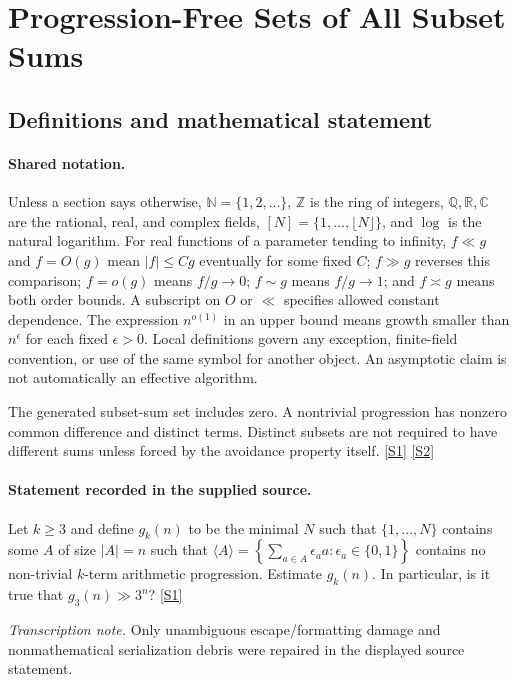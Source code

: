 \documentclass[11pt,a4paper]{article}
\newcommand{\N}{\mathbb{N}}
\newcommand{\Z}{\mathbb{Z}}
\newcommand{\Q}{\mathbb{Q}}
\newcommand{\R}{\mathbb{R}}
\newcommand{\C}{\mathbb{C}}
\newcommand{\sref}[2]{\hyperlink{source:#1:#2}{[S#2]}}
\begin{document}
\section{Progression-Free Sets of All Subset Sums}\label{statement}


\subsection{Definitions and mathematical statement}

\paragraph{Shared notation.}Unless a section says otherwise, $\N=\{1,2,\ldots\}$,
$\Z$ is the ring of integers, $\Q,\R,\C$ are the rational, real, and complex
fields, $[N]=\{1,\ldots,\lfloor N\rfloor\}$, and $\log$ is the natural
logarithm. For real functions of a parameter tending to infinity,
$f\ll g$ and $f=O(g)$ mean $|f|\leq Cg$ eventually for some fixed $C$;
$f\gg g$ reverses this comparison; $f=o(g)$ means $f/g\to0$;
$f\sim g$ means $f/g\to1$; and $f\asymp g$ means both order bounds.
A subscript on $O$ or $\ll$ specifies allowed constant dependence.
The expression $n^{o(1)}$ in an upper bound means growth smaller than
$n^\epsilon$ for each fixed $\epsilon>0$. Local definitions govern any
exception, finite-field convention, or use of the same symbol for another
object. An asymptotic claim is not automatically an effective algorithm.



The generated subset-sum set includes zero. A nontrivial progression has nonzero common difference and distinct terms. Distinct subsets are not required to have different sums unless forced by the avoidance property itself. \sref{statement}{1} \sref{statement}{2}

\paragraph{Statement recorded in the supplied source.}
Let $k\geq 3$ and define $g_k(n)$ to be the minimal $N$ such that $\{1,\ldots,N\}$ contains some $A$ of size $\lvert A\rvert=n$ such that $ \langle A\rangle = \left\{\sum_{a\in A}\epsilon_aa: \epsilon_a\in \{0,1\}\right\} $ contains no non-trivial $k$-term arithmetic progression. Estimate $g_k(n)$. In particular, is it true that $ g_3(n) \gg 3^n? $ \sref{statement}{1}

{\small\emph{Transcription note.} Only unambiguous escape/formatting damage and nonmathematical serialization debris were repaired in the displayed source statement.}
\end{document}
